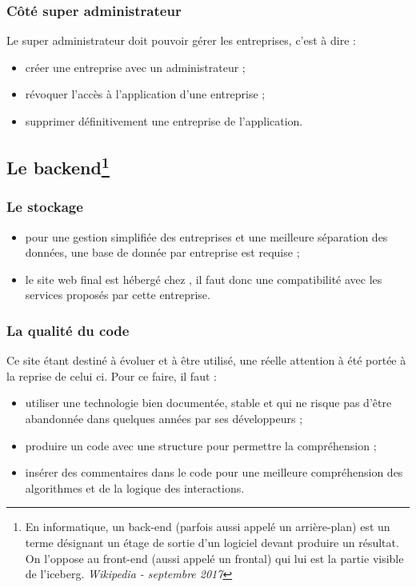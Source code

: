 \documentclass[a4paper, 11pt]{report}
\begin{document}
        \subsubsection{Côté super administrateur}
        Le super administrateur doit pouvoir gérer les entreprises, c'est à dire :
        \begin{itemize}
            \item créer une entreprise avec un administrateur ;
            \item révoquer l'accès à l'application d'une entreprise ;
            \item supprimer définitivement une entreprise de l'application.
        \end{itemize}
    \subsection[Le backend]{Le backend\footnote{En informatique, un back-end (parfois aussi appelé un arrière-plan) est un terme désignant un étage de sortie d'un logiciel devant produire un résultat. On l'oppose au front-end (aussi appelé un frontal) qui lui est la partie visible de l'iceberg. \textit{Wikipedia - septembre 2017}}}
        \subsubsection{Le stockage}
        \begin{itemize}
            \item pour une gestion simplifiée des entreprises et une meilleure séparation des données, une base de donnée par entreprise est requise ;
            \item  le site web final est hébergé chez \oswitch\cite{oswitch}, il faut donc une compatibilité avec les services proposés par cette entreprise.
        \end{itemize}

        \subsubsection{La qualité du code}
        Ce site étant destiné à évoluer et à être utilisé, une réelle attention à été portée à la reprise de celui ci. Pour ce faire, il faut :
        \begin{itemize}
            \item utiliser une technologie bien documentée, stable et qui ne risque pas d'être abandonnée dans quelques années par ses développeurs ;
            \item produire un code avec une structure pour permettre la compréhension ;
            \item insérer des commentaires dans le code pour une meilleure compréhension des algorithmes et de la logique des interactions.
        \end{itemize}
\end{document}
